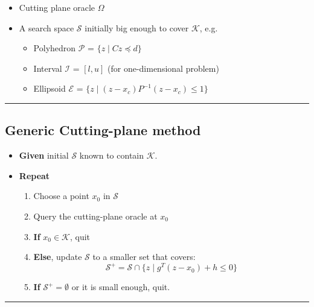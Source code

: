 \documentclass[]{article}
\providecommand{\tightlist}{%
  \setlength{\itemsep}{0pt}\setlength{\parskip}{0pt}}
\begin{document}
\begin{itemize}
\tightlist
\item
  Cutting plane oracle \(\Omega\)
\item
  A search space \(\mathcal{S}\) initially big enough to cover
  \(\mathcal{K}\), e.g.

  \begin{itemize}
  \tightlist
  \item
    Polyhedron \(\mathcal{P}\) = \(\{z \mid C z \preceq d \}\)
  \item
    Interval \(\mathcal{I}\) = \([l, u]\) (for one-dimensional problem)
  \item
    Ellipsoid \(\mathcal{E}\) =
    \(\{z \mid (z-x_c)P^{-1}(z-x_c) \leq 1 \}\)
  \end{itemize}
\end{itemize}

\begin{center}\rule{0.5\linewidth}{\linethickness}\end{center}

\hypertarget{generic-cutting-plane-method}{%
\subsection{Generic Cutting-plane
method}\label{generic-cutting-plane-method}}

\begin{itemize}
\tightlist
\item
  \textbf{Given} initial \(\mathcal{S}\) known to contain
  \(\mathcal{K}\).
\item
  \textbf{Repeat}

  \begin{enumerate}
  \def\labelenumi{\arabic{enumi}.}
  \tightlist
  \item
    Choose a point \(x_0\) in \(\mathcal{S}\)
  \item
    Query the cutting-plane oracle at \(x_0\)
  \item
    \textbf{If} \(x_0 \in \mathcal{K}\), quit
  \item
    \textbf{Else}, update \(\mathcal{S}\) to a smaller set that covers:
    \[\mathcal{S}^+ = \mathcal{S} \cap \{z \mid g^T (z - x_0) + h \leq 0\}\]
  \item
    \textbf{If} \(\mathcal{S}^+ = \emptyset\) or it is small enough,
    quit.
  \end{enumerate}
\end{itemize}

\begin{center}\rule{0.5\linewidth}{\linethickness}\end{center}
\end{document}
